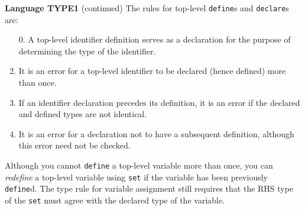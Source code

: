 \begin{minipage}[t]{\sw}
\slidenumber
\LARGE
{\bf Language TYPE1} (continued)\exx
The rules for top-level \verb'define's and \verb'declare's are:
\begin{enumerate}
\item[0.] A top-level identifier definition serves as a declaration
      for the purpose of determining the type of the identifier.
\item It is an error for a top-level identifier
      to be declared (hence defined) more than once.
\item If an identifier declaration precedes its definition,
      it is an error
      if the declared and defined types are not identical.
\item It is an error for a declaration
      not to have a subsequent definition,
      although this error need not be checked.
\end{enumerate}
Although you cannot \verb'define' a top-level variable more than once,
you can {\em redefine} a top-level variable
using \verb'set' if the variable has been previously \verb'define'd.
The type rule for variable assignment still
requires that the RHS type of the \verb'set'
must agree with the declared type of the variable.
\end{minipage}
